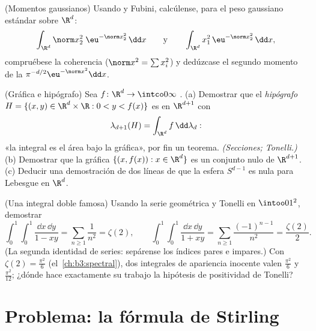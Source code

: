 \begin{exercise}[$\star\star\star$]\label{exo:b3:product:10}
(Momentos gaussianos) Usando  y Fubini, calcúlense, para el peso gaussiano estándar sobre
$\R^d$:
\[
\int_{\R^d}\norm x_2^2\;\eu^{-\norm x_2^2}\,\dd x
\qquad\text{y}\qquad
\int_{\R^d}x_1^2\,\eu^{-\norm x^2_2}\,\dd x,
\]
compruébese la coherencia ($\norm x^2 = \sum x_i^2$) y dedúzcase el
segundo momento de la 
$\pi^{-d/2}\eu^{-\norm x^2}\dd x$.
\end{exercise}

\begin{exercise}[$\star\star$]\label{exo:b3:product:11}
(Gráfica e hipógrafo) Sea $f \colon \R^d \to \intco0\infty$
. (a) Demostrar que el
\emph{hipógrafo} $H = \{(x, y) \in
\R^d\times\R : 0 < y < f(x)\}$ es
 en $\R^{d+1}$ con
\[
\lambda_{d+1}(H) = \int_{\R^d}f\,\dd\lambda_d :
\]
«la integral es el área bajo la gráfica», por fin un teorema.
\emph{(Secciones; Tonelli.)} (b) Demostrar que la gráfica
$\{(x, f(x)) : x \in \R^d\}$ es un conjunto nulo de $\R^{d+1}$. (c)
Deducir una demostración de dos líneas de que la esfera $S^{d-1}$ es
nula para Lebesgue en $\R^d$.
\end{exercise}

\begin{exercise}[$\star\star$]\label{exo:b3:product:12}
(Una integral doble famosa) Usando la serie geométrica y Tonelli en
$\intoo01^2$, demostrar
\[
\int_0^1\!\!\int_0^1\frac{\dd x\,\dd y}{1 - xy}
= \sum_{n\geq1}\frac1{n^2} = \zeta(2),
\qquad
\int_0^1\!\!\int_0^1\frac{\dd x\,\dd y}{1 + xy}
= \sum_{n\geq1}\frac{(-1)^{n-1}}{n^2} = \frac{\zeta(2)}2 .
\]
(La segunda identidad de series: sepárense los índices pares e impares.)
Con $\zeta(2) = \frac{\pi^2}6$ (el~\cref{ch:b3:spectral}), dos
integrales de apariencia inocente valen $\frac{\pi^2}6$ y
$\frac{\pi^2}{12}$; ¿dónde hace exactamente su trabajo la hipótesis de
positividad de Tonelli?
\end{exercise}

\section{Problema: la fórmula de Stirling}


